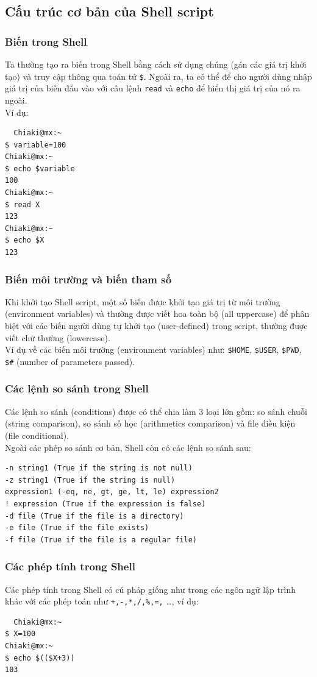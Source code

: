 \documentclass{article}
\begin{document}
\subsection{Cấu trúc cơ bản của Shell script}
\subsubsection{Biến trong Shell}
Ta thường tạo ra biến trong Shell bằng cách sử dụng chúng (gán các giá trị khởi tạo) và truy cập thông qua toán tử
\verb|$|. Ngoài ra, ta có thể để cho người dùng nhập giá trị của biến đầu vào với câu lệnh \verb|read| và \verb|echo| để hiển thị giá trị của nó ra ngoài.
\\ Ví dụ: 
\\ \begin{verbatim}
  Chiaki@mx:~
$ variable=100
Chiaki@mx:~
$ echo $variable
100
Chiaki@mx:~
$ read X
123
Chiaki@mx:~
$ echo $X
123
\end{verbatim}
\subsubsection{Biến môi trường và biến tham số}
Khi khởi tạo Shell script, một số biến được khởi tạo giá trị từ môi trường (environment variables) và thường được viết
hoa toàn bộ (all uppercase) để phân biệt với các biến người dùng tự khởi tạo (user-defined) trong script, thường được viết chữ thường (lowercase).
\\ Ví dụ về các biến môi trường (environment variables) như: \verb|$HOME|, \verb|$USER|, \verb|$PWD|, \verb|$#| (number of parameters passed).
\subsubsection{Các lệnh so sánh trong Shell}
Các lệnh so sánh (conditions) được có thể chia làm 3 loại lớn gồm: so sánh chuỗi (string comparison), so sánh số học (arithmetics comparison) và file điều kiện (file conditional).
\\ Ngoài các phép so sánh cơ bản, Shell còn có các lệnh so sánh sau:
\begin{verbatim}
-n string1 (True if the string is not null)
-z string1 (True if the string is null)
expression1 (-eq, ne, gt, ge, lt, le) expression2
! expression (True if the expression is false)
-d file (True if the file is a directory)
-e file (True if the file exists)
-f file (True if the file is a regular file)
\end{verbatim}
\subsubsection{Các phép tính trong Shell}
Các phép tính trong Shell có cú pháp giống như trong các ngôn ngữ lập trình khác với các phép toán như \verb|+,-,*,/,%,=,| \dots, ví dụ:
\begin{verbatim}
  Chiaki@mx:~
$ X=100
Chiaki@mx:~
$ echo $(($X+3))
103
\end{verbatim}
\end{document}
